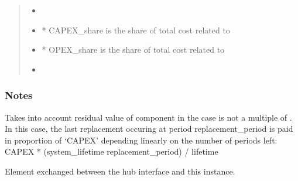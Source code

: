 \documentclass[letterpaper,10pt,english]{sphinxmanual}
\begin{document}
\begin{fulllineitems}
\begin{fulllineitems}
\begin{quote}
\begin{description}
\sphinxAtStartPar
\begin{itemize}
\item {} 
\sphinxAtStartPar
{}

\item {} 
\sphinxAtStartPar
* CAPEX\_share is the share of total cost related to 

\item {} 
\sphinxAtStartPar
* OPEX\_share is the share of total cost related to 

\item {} 
\sphinxAtStartPar
{}

\end{itemize}


\end{description}\end{quote}
\subsubsection*{Notes}

\sphinxAtStartPar
Takes into account residual value of component in the case  is not a multiple of .
In this case, the last replacement occuring at period replacement\_period is paid in proportion of ‘CAPEX’
depending linearly on the number of periods left:
CAPEX * (system\_lifetime \sphinxhyphen{} replacement\_period) / lifetime

\end{fulllineitems}


\begin{fulllineitems}
\label{\detokenize{generated/tamos.elementIO.Load:tamos.elementIO.Load.element}}
\pysigstartsignatures
{}
\pysigstopsignatures
\sphinxAtStartPar
Element exchanged between the hub interface and this instance.

\end{fulllineitems}



\end{fulllineitems}
\end{document}
